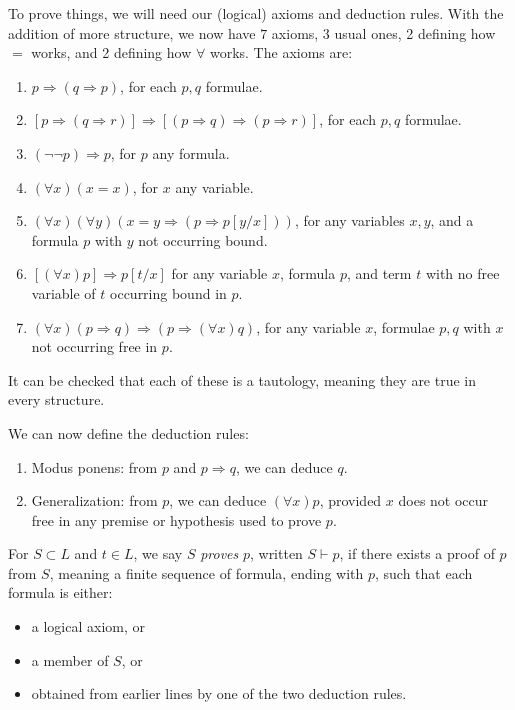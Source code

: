\documentclass[12pt]{article}
\begin{document}
To prove things, we will need our (logical) axioms and deduction rules. With the addition of more structure, we now have $7$ axioms, 3 usual ones, 2 defining how $=$ works, and 2 defining how $\forall$ works. The axioms are:
\begin{enumerate}
	\item $p \Rightarrow (q \Rightarrow p)$, for each $p, q$ formulae.
	\item $[p \Rightarrow (q \Rightarrow r)] \Rightarrow [(p \Rightarrow q) \Rightarrow (p \Rightarrow r)]$, for each $p, q$ formulae.
	\item $(\neg \neg p) \Rightarrow p$, for $p$ any formula.
	\item $(\forall x)(x = x)$, for $x$ any variable.
	\item $(\forall x)(\forall y)(x = y \Rightarrow (p \Rightarrow p[y/x]))$, for any variables $x, y$, and a formula $p$ with $y$ not occurring bound.
	\item $[(\forall x)p] \Rightarrow p[t/x]$ for any variable $x$, formula $p$, and term $t$ with no free variable of $t$ occurring bound in $p$.
	\item $(\forall x)(p \Rightarrow q) \Rightarrow (p \Rightarrow (\forall x) q)$, for any variable $x$, formulae $p, q$ with $x$ not occurring free in $p$.
\end{enumerate}

It can be checked that each of these is a tautology, meaning they are true in every structure.

We can now define the deduction rules:
\begin{enumerate}
	\item Modus ponens: from $p$ and $p \Rightarrow q$, we can deduce $q$.
	\item Generalization: from $p$, we can deduce $(\forall x)p$, provided $x$ does not occur free in any premise or hypothesis used to prove $p$.
\end{enumerate}

For $S \subset L$ and $t \in L$, we say $S$ \emph{proves} $p$, written $S \vdash p$, if there exists a proof of $p$ from $S$, meaning a finite sequence of formula, ending with $p$, such that each formula is either:
\begin{itemize}
	\item a logical axiom, or
	\item a member of $S$, or
	\item obtained from earlier lines by one of the two deduction rules.
\end{itemize}
\end{document}
